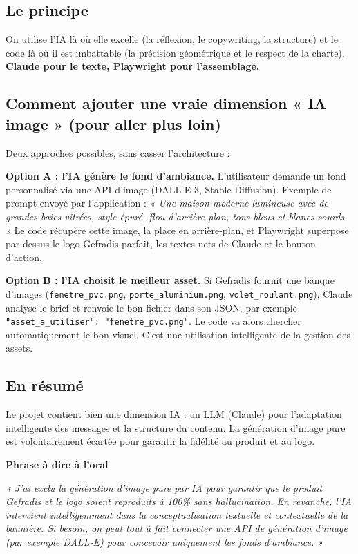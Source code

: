 \documentclass[11pt,a4paper]{article}
\newcommand{\phrasea}[1]{%
  \begin{phrasebox}
  {\bfseries\color{gefblue}\textsf{Phrase à dire à l'oral}}\par\smallskip
  \itshape #1
  \end{phrasebox}%
}
\begin{document}
\subsection{Le principe}
On utilise l'IA là où elle excelle (la réflexion, le copywriting, la structure) et
le code là où il est imbattable (la précision géométrique et le respect de la
charte). \textbf{Claude pour le texte, Playwright pour l'assemblage.}

\subsection{Comment ajouter une vraie dimension « IA image » (pour aller plus loin)}
Deux approches possibles, sans casser l'architecture :

\textbf{Option A : l'IA génère le fond d'ambiance.} L'utilisateur demande un fond
personnalisé via une API d'image (DALL-E 3, Stable Diffusion). Exemple de prompt
envoyé par l'application : \emph{« Une maison moderne lumineuse avec de grandes
baies vitrées, style épuré, flou d'arrière-plan, tons bleus et blancs sourds. »}
Le code récupère cette image, la place en arrière-plan, et Playwright superpose
par-dessus le logo Gefradis parfait, les textes nets de Claude et le bouton
d'action.

\textbf{Option B : l'IA choisit le meilleur asset.} Si Gefradis fournit une banque
d'images (\texttt{fenetre\_pvc.png}, \texttt{porte\_aluminium.png},
\texttt{volet\_roulant.png}), Claude analyse le brief et renvoie le bon fichier
dans son JSON, par exemple \texttt{"asset\_a\_utiliser": "fenetre\_pvc.png"}. Le
code va alors chercher automatiquement le bon visuel. C'est une utilisation
intelligente de la gestion des assets.

\subsection{En résumé}
Le projet contient bien une dimension IA : un LLM (Claude) pour l'adaptation
intelligente des messages et la structure du contenu. La génération d'image pure
est volontairement écartée pour garantir la fidélité au produit et au logo.

\phrasea{« J'ai exclu la génération d'image pure par IA pour garantir que le produit
Gefradis et le logo soient reproduits à 100\% sans hallucination. En revanche,
l'IA intervient intelligemment dans la conceptualisation textuelle et contextuelle
de la bannière. Si besoin, on peut tout à fait connecter une API de génération
d'image (par exemple DALL-E) pour concevoir uniquement les fonds d'ambiance. »}
\end{document}
